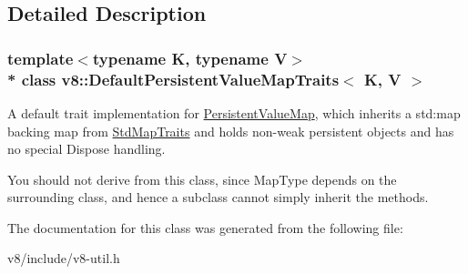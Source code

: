\subsection{Detailed Description}
\subsubsection*{template$<$typename K, typename V$>$\\*
class v8\+::\+Default\+Persistent\+Value\+Map\+Traits$<$ K, V $>$}

A default trait implementation for \hyperlink{classv8_1_1PersistentValueMap}{Persistent\+Value\+Map}, which inherits a std\+:map backing map from \hyperlink{classv8_1_1StdMapTraits}{Std\+Map\+Traits} and holds non-\/weak persistent objects and has no special Dispose handling.

You should not derive from this class, since Map\+Type depends on the surrounding class, and hence a subclass cannot simply inherit the methods. 

The documentation for this class was generated from the following file\+:\begin{DoxyCompactItemize}
\item 
v8/include/v8-\/util.\+h\end{DoxyCompactItemize}
